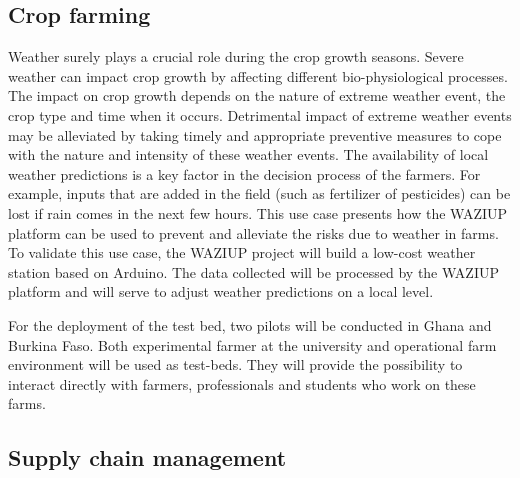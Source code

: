 \subsection{Crop farming}

Weather surely plays a crucial role during the crop growth seasons.
Severe weather can impact crop growth by affecting different bio-physiological processes.
The impact on crop growth depends on the nature of extreme weather event, the crop type and time when it occurs.
Detrimental impact of extreme weather events may be alleviated by taking timely and appropriate preventive measures to cope with the nature and intensity of these weather events.
The availability of local weather predictions is a key factor in the decision process of the farmers.
For example, inputs that are added in the field (such as fertilizer of pesticides) can be lost if rain comes in the next few hours.
This use case presents how the WAZIUP platform can be used to prevent and alleviate the risks due to weather in farms.
To validate this use case, the WAZIUP project will build a low-cost weather station based on Arduino.
The data collected will be processed by the WAZIUP platform and will serve to adjust weather predictions on a local level.

For the deployment of the test bed, two pilots will be conducted in Ghana and Burkina Faso.
Both experimental farmer at the university and operational farm environment will be used as test-beds.
They will provide the possibility to interact directly with farmers, professionals and students who work on these farms.

\subsection{Supply chain management}

